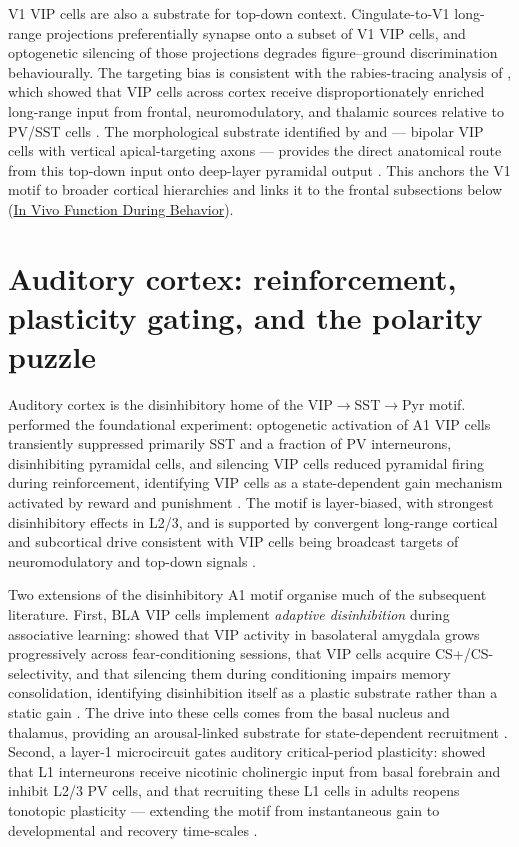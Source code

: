 \documentclass[11pt]{article}
\let\origrightarrow\rightarrow
\def\rightarrow{\ensuremath{\origrightarrow}}
\begin{document}
V1 VIP cells are also a substrate for top-down context. Cingulate-to-V1 long-range projections preferentially synapse onto a subset of V1 VIP cells, and optogenetic silencing of those projections degrades figure--ground discrimination behaviourally. The targeting bias is consistent with the rabies-tracing analysis of \citet{Wall2016}, which showed that VIP cells across cortex receive disproportionately enriched long-range input from frontal, neuromodulatory, and thalamic sources relative to PV/SST cells \citep{Wall2016, Anastasiades2021a}. The morphological substrate identified by \citet{Kawaguchi1996} and \citet{Gonchar2008} --- bipolar VIP cells with vertical apical-targeting axons --- provides the direct anatomical route from this top-down input onto deep-layer pyramidal output \citep{Kawaguchi1996, Gonchar2008, Bastos2023a}. This anchors the V1 motif to broader cortical hierarchies and links it to the frontal subsections below (\href{/in-vivo-behavior}{In Vivo Function During Behavior}).

\section{Auditory cortex: reinforcement, plasticity gating, and the polarity puzzle}

Auditory cortex is the disinhibitory home of the VIP\rightarrow SST\rightarrow Pyr motif. \citet{Pi2013} performed the foundational experiment: optogenetic activation of A1 VIP cells transiently suppressed primarily SST and a fraction of PV interneurons, disinhibiting pyramidal cells, and silencing VIP cells reduced pyramidal firing during reinforcement, identifying VIP cells as a state-dependent gain mechanism activated by reward and punishment \citep{Pi2013}. The motif is layer-biased, with strongest disinhibitory effects in L2/3, and is supported by convergent long-range cortical and subcortical drive consistent with VIP cells being broadcast targets of neuromodulatory and top-down signals \citep{Pi2013, Wall2016}.

Two extensions of the disinhibitory A1 motif organise much of the subsequent literature. First, BLA VIP cells implement \textit{adaptive disinhibition} during associative learning: \citet{Krabbe2019} showed that VIP activity in basolateral amygdala grows progressively across fear-conditioning sessions, that VIP cells acquire CS+/CS- selectivity, and that silencing them during conditioning impairs memory consolidation, identifying disinhibition itself as a plastic substrate rather than a static gain \citep{Krabbe2019}. The drive into these cells comes from the basal nucleus and thalamus, providing an arousal-linked substrate for state-dependent recruitment \citep{Krabbe2019, Wall2016}. Second, a layer-1 microcircuit gates auditory critical-period plasticity: \citet{Takesian2018} showed that L1 interneurons receive nicotinic cholinergic input from basal forebrain and inhibit L2/3 PV cells, and that recruiting these L1 cells in adults reopens tonotopic plasticity --- extending the motif from instantaneous gain to developmental and recovery time-scales \citep{Takesian2018}.
\end{document}
